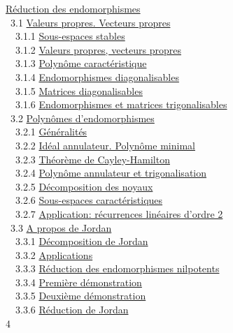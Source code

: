 \documentclass[]{article}
\begin{document}
\href{coursch4.html\#x20-1010003}{Réduction des endomorphismes} \\ ~3.1
\href{coursse15.html\#x21-1020003.1}{Valeurs propres. Vecteurs propres}
\\ ~~3.1.1 \href{coursse15.html\#x21-1030003.1.1}{Sous-espaces stables}
\\ ~~3.1.2 \href{coursse15.html\#x21-1040003.1.2}{Valeurs propres,
vecteurs propres} \\ ~~3.1.3
\href{coursse15.html\#x21-1050003.1.3}{Polynôme caractéristique} \\
~~3.1.4 \href{coursse15.html\#x21-1060003.1.4}{Endomorphismes
diagonalisables} \\ ~~3.1.5
\href{coursse15.html\#x21-1070003.1.5}{Matrices diagonalisables} \\
~~3.1.6 \href{coursse15.html\#x21-1080003.1.6}{Endomorphismes et
matrices trigonalisables} \\ ~3.2
\href{coursse16.html\#x22-1090003.2}{Polynômes d'endomorphismes} \\
~~3.2.1 \href{coursse16.html\#x22-1100003.2.1}{Généralités} \\ ~~3.2.2
\href{coursse16.html\#x22-1110003.2.2}{Idéal annulateur. Polynôme
minimal} \\ ~~3.2.3 \href{coursse16.html\#x22-1120003.2.3}{Théorème de
Cayley-Hamilton} \\ ~~3.2.4
\href{coursse16.html\#x22-1130003.2.4}{Polynôme annulateur et
trigonalisation} \\ ~~3.2.5
\href{coursse16.html\#x22-1140003.2.5}{Décomposition des noyaux} \\
~~3.2.6 \href{coursse16.html\#x22-1150003.2.6}{Sous-espaces
caractéristiques} \\ ~~3.2.7
\href{coursse16.html\#x22-1160003.2.7}{Application: récurrences
linéaires d'ordre 2} \\ ~3.3 \href{coursse17.html\#x23-1170003.3}{A
propos de Jordan} \\ ~~3.3.1
\href{coursse17.html\#x23-1180003.3.1}{Décomposition de Jordan} \\
~~3.3.2 \href{coursse17.html\#x23-1190003.3.2}{Applications} \\ ~~3.3.3
\href{coursse17.html\#x23-1200003.3.3}{Réduction des endomorphismes
nilpotents} \\ ~~3.3.4 \href{coursse17.html\#x23-1210003.3.4}{Première
démonstration} \\ ~~3.3.5
\href{coursse17.html\#x23-1220003.3.5}{Deuxième démonstration} \\
~~3.3.6 \href{coursse17.html\#x23-1230003.3.6}{Réduction de Jordan} \\ 4
\end{document}
